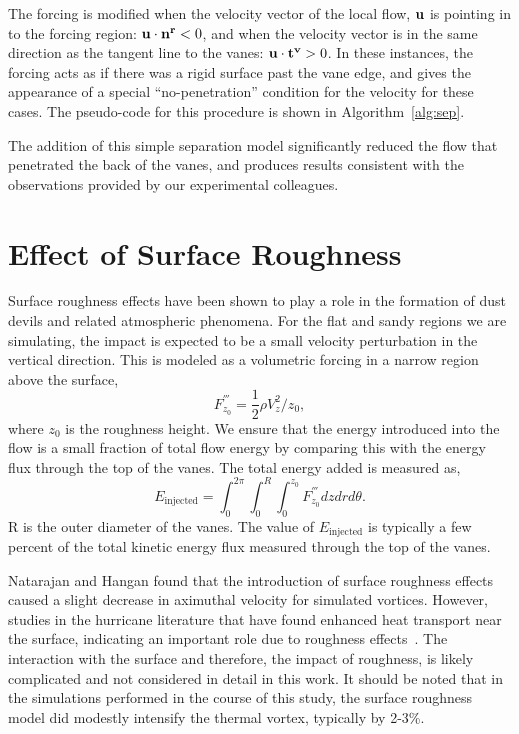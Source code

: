 The forcing is modified when the velocity vector of the local flow, $\bf
u$ is pointing in to the forcing region: ${\bf u} \cdot {\bf n^r} < 0$, and
when the velocity vector is in the same direction as the tangent line to
the vanes: ${\bf u} \cdot {\bf t^v} > 0 $. In these instances, the
forcing acts as if there was a rigid surface past the vane edge, and
gives the appearance of a special ``no-penetration'' condition for the
velocity for these cases. The pseudo-code for this procedure is shown in
Algorithm~\ref{alg:sep}.

The addition of this simple separation model significantly reduced the
flow that penetrated the back of the vanes, and produces results
consistent with the observations provided by our experimental
colleagues.  

\section{Effect of Surface Roughness}


Surface roughness effects have been shown to play a role in the
formation of dust devils and related atmospheric
phenomena\cite{oke1987boundary}. For the flat and sandy
regions we are simulating, the impact is expected to be a small velocity
perturbation  in the vertical direction. This is modeled as a volumetric
forcing in a narrow region above the surface, 
\begin{equation}
 F^{'''}_{z_0} = \frac{1}{2}\rho V_z^2/z_{0}, 
\end{equation}
where $z_{0}$ is the roughness height. We ensure that the energy
introduced into the flow is a small fraction of total flow energy by comparing
this with the energy flux through the top of the vanes. The total energy
added is measured as,  
\begin{equation}
 E_{\text{injected}} = \int_0^{2\pi} \int_0^R \int_0^{z_0} F^{'''}_{z_0}
  dz dr d\theta.  
\end{equation}
R is the outer diameter of the vanes. 
The value of $E_{\text{injected}}$ is typically a few percent of the
total kinetic energy flux measured through the top of the
vanes.

Natarajan and Hangan\cite{Natarajan2012577} found that the introduction
of surface roughness effects caused a slight decrease in aximuthal
velocity for simulated vortices. However, studies in the hurricane
literature that have found enhanced heat transport near the surface,
indicating an important role due to roughness
effects~\cite{Zeng2010,GRL:GRL50047,hurricane_drag}. The interaction
with the surface and therefore, the impact of roughness, is likely
complicated and not considered in detail in this work. It should be
noted that in the simulations performed in the course of this study, the
surface roughness model did modestly intensify the thermal vortex,
typically by 2-3\%.  

